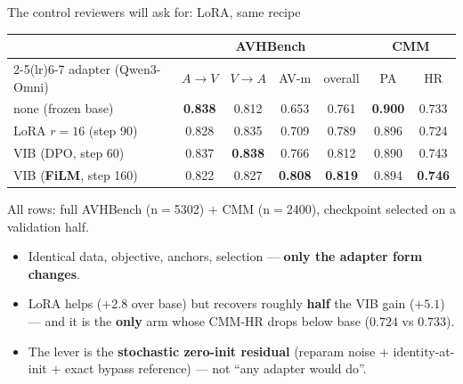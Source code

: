 \documentclass[aspectratio=169,11pt]{beamer}
\begin{document}
\begin{frame}{The control reviewers will ask for: LoRA, same recipe}
\centering\footnotesize
\renewcommand{\arraystretch}{1.2}
\setlength{\tabcolsep}{4.5pt}
\begin{tabular}{l cccc cc}
\toprule
& \multicolumn{4}{c}{AVHBench} & \multicolumn{2}{c}{CMM} \\
\cmidrule(lr){2-5}\cmidrule(lr){6-7}
adapter (Qwen3-Omni) & $A\!\to\!V$ & $V\!\to\!A$ & AV-m & overall & PA & HR \\
\midrule
none (frozen base)        & \textbf{0.838} & 0.812 & 0.653 & 0.761 & \textbf{0.900} & 0.733 \\
LoRA $r{=}16$ (step 90)   & 0.828 & 0.835 & 0.709 & 0.789 & 0.896 & 0.724 \\ %
VIB (DPO, step 60)        & 0.837 & \textbf{0.838} & 0.766 & 0.812 & 0.890 & 0.743 \\
VIB (\textbf{FiLM}, step 160) & 0.822 & 0.827 & \textbf{0.808} & \textbf{0.819} & 0.894 & \textbf{0.746} \\
\bottomrule
\end{tabular}
\par\vspace{0.3em}
{\scriptsize All rows: full AVHBench (n$=$5302) $+$ CMM (n$=$2400), checkpoint selected on a
validation half.}
\vfill
\begin{itemize}\small
\item Identical data, objective, anchors, selection --- \textbf{only the adapter form changes}.
\item LoRA helps (\textbf{$+2.8$} over base) but recovers roughly \textbf{half} the VIB gain
($+5.1$) --- and it is the \textbf{only} arm whose CMM-HR drops below base ($0.724$ vs $0.733$).
\item The lever is the \textbf{stochastic zero-init residual} (reparam noise $+$ identity-at-init
$+$ exact bypass reference) --- not ``any adapter would do''.
\end{itemize}
\end{frame}
\end{document}
